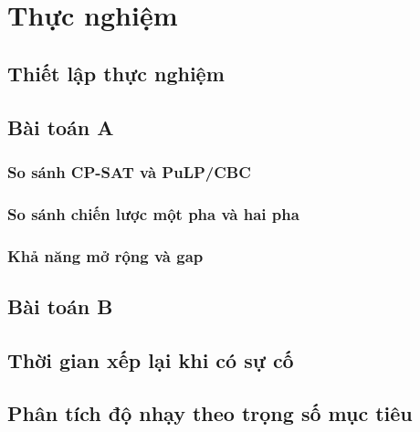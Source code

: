 
\chapter{Thực nghiệm}
\label{ch:thuc-nghiem}

\section{Thiết lập thực nghiệm}
\label{sec:thiet-lap}

\section{Bài toán A}
\label{sec:tn-a}

\subsection{So sánh CP-SAT và PuLP/CBC}
\label{subsec:tn-a-solver}

\subsection{So sánh chiến lược một pha và hai pha}
\label{subsec:tn-a-chien-luoc}

\subsection{Khả năng mở rộng và gap}
\label{subsec:tn-a-mo-rong}

\section{Bài toán B}
\label{sec:tn-b}

\section{Thời gian xếp lại khi có sự cố}
\label{sec:tn-xep-lai}

\section{Phân tích độ nhạy theo trọng số mục tiêu}
\label{sec:do-nhay}
